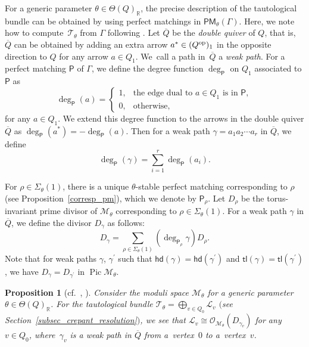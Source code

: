 \documentclass[pdftex]{sigma}
\numberwithin{equation}{section}
\newtheorem{Proposition}[Theorem]{Proposition}
\theoremstyle{definition}
\newcommand{\RR}{\mathbb{R}}
\newcommand{\calL}{\mathcal{L}}
\newcommand{\calM}{\mathcal{M}}
\newcommand{\calO}{\mathcal{O}}
\newcommand{\calT}{\mathcal{T}}
\newcommand{\sfP}{\mathsf{P}}
\newcommand{\Pic}{\operatorname{Pic}}
\newcommand{\hd}{\mathsf{hd}}
\newcommand{\tl}{\mathsf{tl}}
\newcommand{\PM}{\mathsf{PM}}
\begin{document}
For a generic parameter $\theta\in\Theta(Q)_\RR$, the precise description of the tautological bundle \smash{$\calT_\theta=\bigoplus_{v\in Q_0}\calL_v$}
can be obtained by using perfect matchings in $\PM_\theta(\Gamma)$.
Here, we note how to compute~$\calT_\theta$ from $\Gamma$ following \cite[Section~2.5]{BCQV_recipe}.
Let $\overline{Q}$ be the \emph{double quiver} of $Q$, that is, $\overline{Q}$ can be obtained by adding an extra arrow $a^\ast\in (Q^{\rm op})_1$
in the opposite direction to $Q$ for any arrow $a\in Q_1$. We~call a path in~$\overline{Q}$ a \emph{weak path}.
For a perfect matching $\sfP$ of $\Gamma$, we define the degree function $\deg_\sfP$ on $Q_1$ associated to $\sfP$ as
\begin{equation*}%
\deg_\sfP(a)=
\begin{cases}
1, & \text{the edge dual to $a\in Q_1$ is in $\sfP$},\\
0, & \text{otherwise},
\end{cases}
\end{equation*}
for any $a\in Q_1$.
We extend this degree function to the arrows in the double quiver $\overline{Q}$ as $\deg_\sfP(a^\ast)=-\deg_\sfP(a)$.
Then for a weak path $\gamma=a_1a_2\cdots a_r$ in $\overline{Q}$, we define
\[
\deg_\sfP(\gamma)=\sum_{i=1}^r\deg_\sfP(a_i).
\]

For $\rho\in\Sigma_\theta(1)$, there is a unique $\theta$-stable perfect matching corresponding to $\rho$ (see Proposition~\ref{corresp_pm}),
which we denote by $\sfP_\rho$.
Let $D_\rho$ be the torus-invariant prime divisor of $\calM_\theta$ corresponding to $\rho\in\Sigma_\theta(1)$.
For a weak path $\gamma$ in $\overline{Q}$, we define the divisor $D_\gamma$ as follows:
\[
D_\gamma=\sum_{\rho\in \Sigma_\theta(1)}(\deg_{\sfP_\rho} \gamma)D_\rho.
\]
Note that for weak paths $\gamma$, $\gamma^\prime$ such that $\hd(\gamma)=\hd(\gamma^\prime)$ and $\tl(\gamma)=\tl(\gamma^\prime)$,
we have $D_\gamma=D_{\gamma^\prime}$ in $\Pic\calM_\theta$.

\begin{Proposition}[{cf.\ \cite[Theorem~4.2]{BM_crepant}, \cite[Lemma~2.10]{BCQV_recipe}}]\label{prop_compute_tautological}
Consider the moduli space $\calM_\theta$ for a generic parameter $\theta\in\Theta(Q)_\RR$.
For the tautological bundle $\calT_\theta= \bigoplus_{v\in Q_0}\calL_v$ $($see Section~{\rm \ref{subsec_crepant_resolution}}$)$,
we see that $\calL_v \cong \calO_{\calM_\theta}(D_{\gamma_v})$ for any $v\in Q_0$, where~$\gamma_v$ is a weak path in $\overline{Q}$ from a~vertex~$0$ to a~vertex~$v$.
\end{Proposition}
\end{document}
